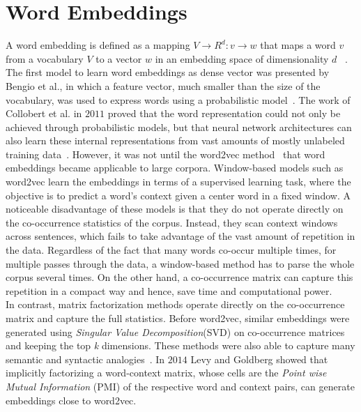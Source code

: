 \section{Word Embeddings}
\label{sec:wordembeddig}
A word embedding is defined as a mapping $ V\rightarrow { R }^{ d }:v \rightarrow w $ that maps a word $v$ from a vocabulary $V$ to a vector  $w$  in an embedding space of dimensionality $d$ ~. The first model to learn word embeddings as dense vector was presented by Bengio et al., in which a feature vector, much smaller than the size of the vocabulary, was used to express words using a probabilistic model~. The work of Collobert et al. in $2011$ proved that the word representation could not only be achieved through probabilistic models, but that neural network architectures can also learn these internal representations from vast amounts of mostly unlabeled training data~. However, it was not until the word2vec method~ that word embeddings became applicable to large corpora. 
Window-based models such as word2vec learn the embeddings in terms of a supervised learning task, where the objective is to predict a word's context given a center word in a fixed window. A noticeable disadvantage of these models is that they do not operate directly on the co-occurrence statistics of the corpus. Instead, they scan context windows across sentences, which fails to take advantage of the vast amount of repetition in the data. Regardless of the fact that many words co-occur multiple times, for multiple passes through the data, a window-based method has to parse the whole corpus several times. On the other hand, a co-occurrence matrix can capture this repetition in a compact way and hence, save time and computational power.  \\
In contrast, matrix factorization methods operate directly on the co-occurrence matrix and capture the full statistics. Before word2vec, similar embeddings were generated using \emph{Singular Value Decomposition}(SVD) on co-occurrence matrices and keeping the top \emph{k} dimensions. These methods were also able to capture many semantic and syntactic analogies~. In $2014$ Levy and Goldberg showed that implicitly factorizing a word-context matrix, whose cells are the \emph{Point wise Mutual Information} (PMI) of the respective word and context pairs, can generate embeddings close to word2vec.
